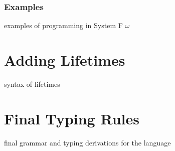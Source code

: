\subsubsection{Examples}
examples of programming in System F $\omega$

\section{Adding Lifetimes}
syntax of lifetimes

\section{Final Typing Rules}
final grammar and typing derivations for the language

